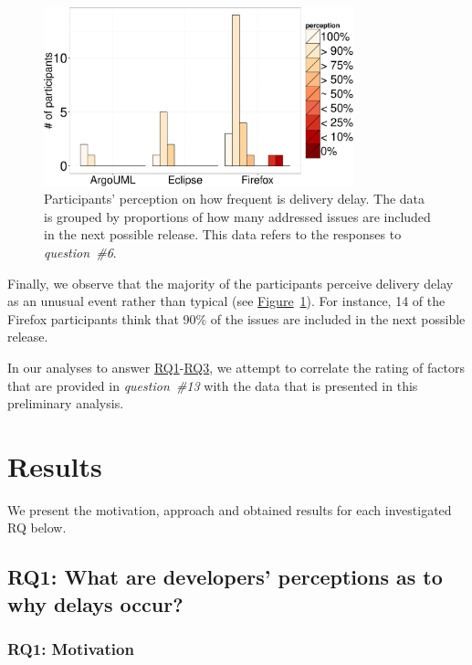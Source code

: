 \begin{figure}
	\centering
	\includegraphics[width=0.80\textwidth,keepaspectratio] 
	{chapters/chapter5/figures/delay_perception.pdf}
	\caption{Participants' perception on how frequent is delivery delay. The data is grouped by proportions of
		how many addressed issues are included in the next possible
		release. This data refers to the responses to {\em question~\#6}.}
	\label{fig:delay_perception}
\end{figure}
Finally, we observe that the majority of the participants perceive delivery
delay as an unusual event rather than typical (see
\hyperref[fig:delay_perception]{Figure}~\ref{fig:delay_perception}). For
instance, 14 of the Firefox participants think that 90\% of the issues are
included in the next possible release.

In our analyses to answer \hyperref[ch5:rq1]{RQ1}-\hyperref[ch5:rq3]{RQ3}, we
attempt to correlate the rating of factors that are provided in {\em
question~\#13} with the data that is presented in this preliminary analysis.

\section{Results} \label{ch6:results}

We present the motivation, approach and obtained results for each investigated
RQ below.

\subsection{RQ1: What are developers' perceptions as to why \DIFdelbegin {}\DIFdelend \DIFaddbegin {}\DIFaddend delays
occur?}\label{ch5:rq1}

\subsubsection*{RQ1: Motivation}

